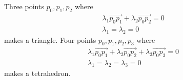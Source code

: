 \documentclass{article}
\begin{document}
Three points $p_0, p_1, p_2$ where
\begin{eqnarray}
\lambda_1 \vec{p_0 p_1} + \lambda_2 \vec{p_0 p_2} = 0 \\
\lambda_1 = \lambda_2 = 0
\end{eqnarray}
makes a triangle. Four points $p_0, p_1, p_2, p_3$ where
\begin{eqnarray}
\lambda_1 \vec{p_0 p_1} + \lambda_2 \vec{p_0 p_2} + \lambda_3 \vec{p_0 p_3} = 0 \\
\lambda_1 = \lambda_2 = \lambda_3 = 0
\end{eqnarray}
makes a tetrahedron.
\end{document}

